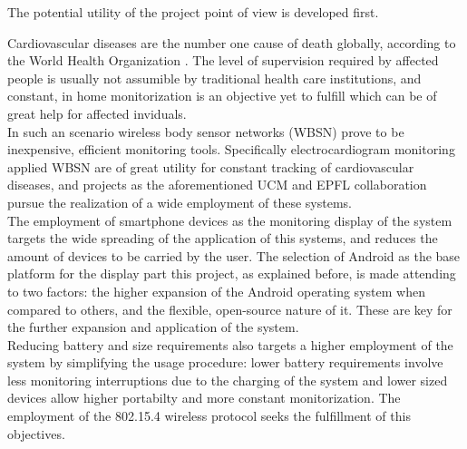 		The potential utility of the project point of view is developed first.\\

		\begin{comment}
		x CardioVascular Diseases (CVD) as high risk, expanded cause of death (citamos a la OMS)
		x WBSN as a cheap, efficient method of monitoring, particularly ECG monitoring for CVD preventing.
		x Smartphones as ubiquous monitoring window.
		x EPFL's shimmer + iPhone bluetooth monitoring system.
		x Bluetooth battery requirements don't suffice for expected device usage time.
		x 802.15.4 as a more efficient alternative.
		x Smartphones not equipped with 802.15.4 -> Development of a receiver device.
		x Android as more open, flexible, expanded platform than iOS.
		x .·. Android + 802.15.4 (through a receiver device) + shimmer for continous ECG monitoring.
		\end{comment}

		Cardiovascular diseases are the number one cause of death globally, according to the World Health Organization \cite{who-cvd}. The level of supervision required by affected people is usually not assumible by traditional health care institutions, and constant, in home monitorization is an objective yet to fulfill which can be of great help for affected inviduals.\\

		In such an scenario wireless body sensor networks (WBSN) prove to be inexpensive, efficient monitoring tools. Specifically electrocardiogram monitoring applied WBSN are of great utility for constant tracking of cardiovascular diseases, and projects as the aforementioned UCM and EPFL collaboration pursue the realization of a wide employment of these systems.\\

		The employment of smartphone devices as the monitoring display of the system targets the wide spreading of the application of this systems, and reduces the amount of devices to be carried by the user. The selection of Android as the base platform for the display part this project, as explained before, is made attending to two factors: the higher expansion of the Android operating system when compared to others, and the flexible, open-source nature of it. These are key for the further expansion and application of the system.\\

		Reducing battery and size requirements also targets a higher employment of the system by simplifying the usage procedure: lower battery requirements involve less monitoring interruptions due to the charging of the system and lower sized devices allow higher portabilty and more constant monitorization. The employment of the 802.15.4 wireless protocol seeks the fulfillment of this objectives.\\

